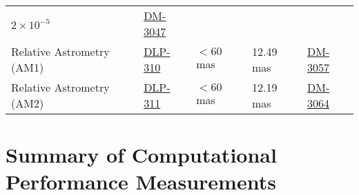 \documentclass[DM,toc]{lsstdoc}
\begin{document}
\begin{longtable}[]{@{}lllll@{}}
\begin{minipage}[t]{0.17\columnwidth}
\(2\times 10^{-5}\)\strut
\end{minipage} & \begin{minipage}[t]{0.14\columnwidth}\raggedright\strut
\href{https://jira.lsstcorp.org/browse/DM-3047}{DM-3047}\strut
\end{minipage}\tabularnewline
\begin{minipage}[t]{0.30\columnwidth}\raggedright\strut
Relative Astrometry (AM1)\strut
\end{minipage} & \begin{minipage}[t]{0.11\columnwidth}\raggedright\strut
\href{https://jira.lsstcorp.org/browse/DLP-310}{DLP-310}\strut
\end{minipage} & \begin{minipage}[t]{0.15\columnwidth}\raggedright\strut
\(< 60\) mas\strut
\end{minipage} & \begin{minipage}[t]{0.17\columnwidth}\raggedright\strut
12.49 mas\strut
\end{minipage} & \begin{minipage}[t]{0.14\columnwidth}\raggedright\strut
\href{https://jira.lsstcorp.org/browse/DM-3057}{DM-3057}\strut
\end{minipage}\tabularnewline
\begin{minipage}[t]{0.30\columnwidth}\raggedright\strut
Relative Astrometry (AM2)\strut
\end{minipage} & \begin{minipage}[t]{0.11\columnwidth}\raggedright\strut
\href{https://jira.lsstcorp.org/browse/DLP-311}{DLP-311}\strut
\end{minipage} & \begin{minipage}[t]{0.15\columnwidth}\raggedright\strut
\(< 60\) mas\strut
\end{minipage} & \begin{minipage}[t]{0.17\columnwidth}\raggedright\strut
12.19 mas\strut
\end{minipage} & \begin{minipage}[t]{0.14\columnwidth}\raggedright\strut
\href{https://jira.lsstcorp.org/browse/DM-3064}{DM-3064}\strut
\end{minipage}\tabularnewline
\bottomrule
\end{longtable}

\section{Summary of Computational Performance
Measurements}\label{summary-of-computational-performance-measurements}
\end{document}
